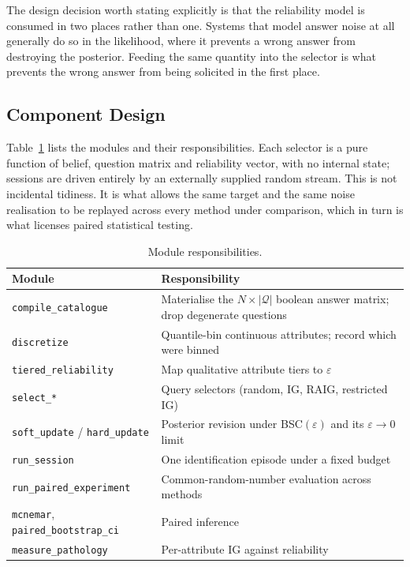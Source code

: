 \documentclass[conference]{IEEEtran}
\newcommand{\Qset}{\mathcal{Q}}
\begin{document}
The design decision worth stating explicitly is that the reliability model is
consumed in two places rather than one. Systems that model answer noise at all
generally do so in the likelihood, where it prevents a wrong answer from
destroying the posterior. Feeding the same quantity into the selector is what
prevents the wrong answer from being solicited in the first place.

\subsection{Component Design}

Table~\ref{tab:modules} lists the modules and their responsibilities. Each
selector is a pure function of belief, question matrix and reliability vector,
with no internal state; sessions are driven entirely by an externally supplied
random stream. This is not incidental tidiness. It is what allows the same
target and the same noise realisation to be replayed across every method under
comparison, which in turn is what licenses paired statistical testing.

\begin{table}[t]
\caption{Module responsibilities.}
\label{tab:modules}
\centering
\footnotesize
\begin{tabular}{@{}p{}p{}@{}}
\toprule
\textbf{Module} & \textbf{Responsibility} \\
\midrule
\texttt{compile\_catalogue} & Materialise the $N \times |\Qset|$ boolean answer matrix; drop degenerate questions \\
\texttt{discretize} & Quantile-bin continuous attributes; record which were binned \\
\texttt{tiered\_reliability} & Map qualitative attribute tiers to $\varepsilon$ \\
\texttt{select\_*} & Query selectors (random, IG, RAIG, restricted IG) \\
\texttt{soft\_update} / \texttt{hard\_update} & Posterior revision under BSC$(\varepsilon)$ and its $\varepsilon\!\to\!0$ limit \\
\texttt{run\_session} & One identification episode under a fixed budget \\
\texttt{run\_paired\_experiment} & Common-random-number evaluation across methods \\
\texttt{mcnemar}, \texttt{paired\_bootstrap\_ci} & Paired inference \\
\texttt{measure\_pathology} & Per-attribute IG against reliability \\
\bottomrule
\end{tabular}
\end{table}
\end{document}

